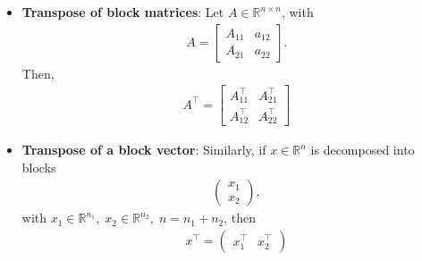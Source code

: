 \documentclass{report}
\begin{document}
\begin{itemize}
                    \[
                        =
                        \begin{blockarray}{cc}
  &  \\
  \begin{block}{[cc]}
      A_{11}X_{11} + A_{12}X_{21} & A_{11}X_{12} + A_{12}X_{22} \\
      A_{21}X_{11} + A_{22}X_{21} & A_{21}X_{12} + A_{22}X_{22} \\
  \end{block}
                        \end{blockarray}
                    \]

                    That is,
                    \[
                        B_{ij} = \sum_{k=1}^2 A_{ik} X_{kj}, 
                        \qquad i,j = 1,2.
                    \]

                \item \textbf{Transpose of block matrices}: Let $A \in \mathbb{R}^{n\times n}$, with
                    \begin{align*}
                        A  = \begin{bmatrix} A_{11} & a_{12} \\ A_{21} & a_{22} \end{bmatrix}
                    .\end{align*}
                    Then, 
                    \begin{align*}
                        A^{\top} = \begin{bmatrix}
                            A_{11}^{\top} & A_{21}^{\top} \\ A_{12}^{\top} & A_{22}^{\top}
                        \end{bmatrix}
                    \end{align*}
                \item \textbf{Transpose of a block vector}: Similarly, if $ x \in \mathbb{R}^{n}$ is decomposed into blocks
                    \begin{align*}
                        \begin{pmatrix} x_{1} \\ x_{2} \end{pmatrix}
                    ,\end{align*}
                    with $x_{1} \in \mathbb{R}^{n_{1}} ,\; x_{2} \in \mathbb{R}^{n_{2}},\; n = n_{1} + n_{2}$, then
                    \begin{align*}
                        x^{\top} = \begin{pmatrix} x_{1}^{\top} & x_{2}^{\top} \end{pmatrix}
                    \end{align*}



    \end{itemize}
\end{document}
